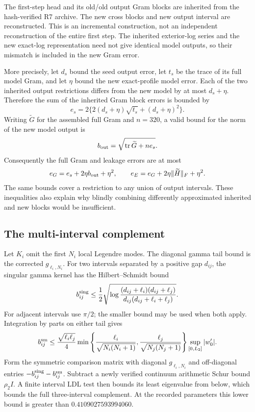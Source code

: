 The first-step head and its old/old output Gram blocks are inherited from
the hash-verified R7 archive. The new cross blocks and new output interval
are reconstructed. This is an incremental construction, not an independent
reconstruction of the entire first step. The inherited exterior-log series
and the new exact-log representation need not give identical model outputs,
so their mismatch is included in the new Gram error.

More precisely, let \(d_s\) bound the seed output error, let
\(t_s\) be the trace of its full model Gram, and let \(\eta\) bound the
new exact-profile model error. Each of the two inherited output restrictions
differs from the new model by at most \(d_s+\eta\). Therefore the sum of the
inherited Gram block errors is bounded by
\[
 e_s=2\{2(d_s+\eta)\sqrt{t_s}+(d_s+\eta)^2\}.
\]
Writing \(\widetilde G\) for the assembled full Gram and \(n=320\), a valid
bound for the norm of the new model output is
\[
 b_{\rm out}=\sqrt{\operatorname{tr}\widetilde G+n e_s}.
\]
Consequently the full Gram and leakage errors are at most
\[
 e_G=e_s+2\eta b_{\rm out}+\eta^2,\qquad
 e_E=e_G+2\eta\|\widetilde H\|_F+\eta^2.
\]
The same bounds cover a restriction to any union of output intervals.
These inequalities also explain why blindly combining differently
approximated inherited and new blocks would be insufficient.

\subsection{The multi-interval complement}
Let \(K_i\) omit the first \(N_i\) local Legendre modes. The diagonal gamma
tail bound is the corrected \(g_{\ell_i,N_i}\). For two intervals separated
by a positive gap \(d_{ij}\), the singular gamma kernel has the
Hilbert--Schmidt bound
\[
 b_{ij}^{\rm sing}\le
 \frac12\sqrt{\log
 \frac{(d_{ij}+\ell_i)(d_{ij}+\ell_j)}
 {d_{ij}(d_{ij}+\ell_i+\ell_j)}}.
\]
For adjacent intervals use \(\pi/2\); the smaller bound may be used when
both apply. Integration by parts on either tail gives
\[
 b_{ij}^{\rm sm}\le
 \frac{\sqrt{\ell_i\ell_j}}4
 \min\left\{\frac{\ell_i}{\sqrt{N_i(N_i+1)}},
             \frac{\ell_j}{\sqrt{N_j(N_j+1)}}\right\}
 \sup_{[0,L_2]}|w_0'|.
\]
Form the symmetric comparison matrix with diagonal \(g_{\ell_i,N_i}\)
and off-diagonal entries \(-b_{ij}^{\rm sing}-b_{ij}^{\rm sm}\).
Subtract a newly verified continuum arithmetic Schur bound \(\rho_2 I\).
A finite interval LDL test then bounds its least eigenvalue from below,
which bounds the full three-interval complement. At the recorded parameters
this lower bound is greater than \(0.4109027593994060\).

